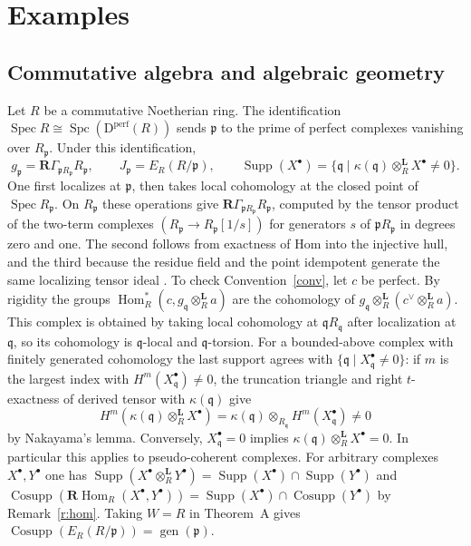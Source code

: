 \documentclass[11pt,reqno]{amsart}
\theoremstyle{definition}
\DeclareMathOperator{\Cosupp}{Cosupp}
\DeclareMathOperator{\Supp}{Supp}
\DeclareMathOperator{\gen}{gen}
\DeclareMathOperator{\Spc}{Spc}
\DeclareMathOperator{\Spec}{Spec}
\DeclareMathOperator{\Hom}{Hom}
\newcommand{\D}{\mathrm D}
\newcommand{\p}{\mathfrak p}
\newcommand{\q}{\mathfrak q}
\newcommand{\RHom}{\mathbf R\!\operatorname{Hom}}
\newcommand{\RG}{\mathbf R\Gamma}
\newcommand{\dt}{\otimes^{\mathbf L}}
\numberwithin{equation}{section}
\begin{document}
\section{Examples}\label{s:examples}
\subsection{Commutative algebra and algebraic geometry}
Let $R$ be a commutative Noetherian ring. The identification $\Spec R\cong\Spc(\D^{\mathrm{perf}}(R))$ sends $\p$ to the prime of perfect complexes vanishing over $R_{\p}$. Under this identification,
\[
 g_{\p}=\RG_{\p R_{\p}}R_{\p},\qquad
 J_{\p}=E_R(R/\p),\qquad
 \Supp(X^\bullet)=\{\q\mid\kappa(\q)\dt_R X^\bullet\ne0\}.
\]
One first localizes at $\p$, then takes local cohomology at the closed point of $\Spec R_{\p}$. On $R_{\p}$ these operations give $\RG_{\p R_{\p}}R_{\p}$, computed by the tensor product of the two-term complexes $(R_{\p}\to R_{\p}[1/s])$ for generators $s$ of $\p R_{\p}$ in degrees zero and one. The second follows from exactness of Hom into the injective hull, and the third because the residue field and the point idempotent generate the same localizing tensor ideal \cite{bik,bchs}. To check Convention~\ref{conv}, let $c$ be perfect. By rigidity the groups $\Hom^*_R(c,g_{\q}\dt_R a)$ are the cohomology of $g_{\q}\dt_R(c^\vee\dt_R a)$. This complex is obtained by taking local cohomology at $\q R_{\q}$ after localization at $\q$, so its cohomology is $\q$-local and $\q$-torsion. For a bounded-above complex with finitely generated cohomology the last support agrees with $\{\q\mid X^\bullet_{\q}\ne0\}$: if $m$ is the largest index with $H^m(X^\bullet_{\q})\ne0$, the truncation triangle and right $t$-exactness of derived tensor with $\kappa(\q)$ give
\[
 H^m(\kappa(\q)\dt_R X^\bullet)=\kappa(\q)\otimes_{R_{\q}}H^m(X^\bullet_{\q})\ne0
\]
by Nakayama's lemma. Conversely, $X^\bullet_{\q}=0$ implies $\kappa(\q)\dt_R X^\bullet=0$. In particular this applies to pseudo-coherent complexes. For arbitrary complexes $X^\bullet,Y^\bullet$ one has $\Supp(X^\bullet\dt_R Y^\bullet)=\Supp(X^\bullet)\cap\Supp(Y^\bullet)$ and
$\Cosupp(\RHom_R(X^\bullet,Y^\bullet))=\Supp(X^\bullet)\cap\Cosupp(Y^\bullet)$ by Remark~\ref{r:hom}. Taking $W=R$ in Theorem~A gives $\Cosupp(E_R(R/\p))=\gen(\p)$.
\end{document}

